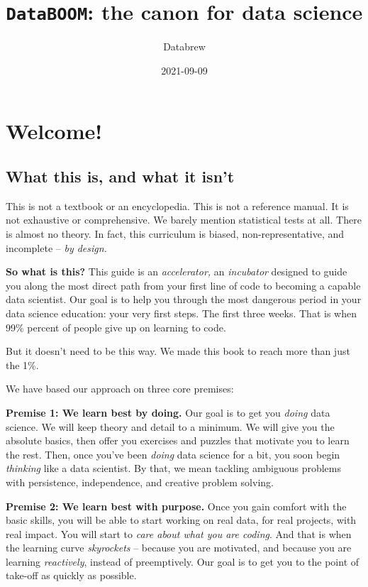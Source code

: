 \documentclass[
]{book}
\title{\texttt{DataBOOM}: the canon for data science}
\author{Databrew}
\date{2021-09-09}
\begin{document}
\maketitle

{
\setcounter{tocdepth}{1}
\tableofcontents
}
\hypertarget{welcome}{%
\chapter{Welcome!}\label{welcome}}

\hypertarget{what-this-is-and-what-it-isnt}{%
\section*{What this is, and what it isn't}\label{what-this-is-and-what-it-isnt}}

This is not a textbook or an encyclopedia. This is not a reference manual. It is not exhaustive or comprehensive. We barely mention statistical tests at all. There is almost no theory. In fact, this curriculum is biased, non-representative, and incomplete -- \emph{by design.}

\textbf{So what is this?} This guide is an \emph{accelerator,} an \emph{incubator} designed to guide you along the most direct path from your first line of code to becoming a capable data scientist. Our goal is to help you through the most dangerous period in your data science education: your very first steps. The first three weeks. That is when 99\% percent of people give up on learning to code.

But it doesn't need to be this way. We made this book to reach more than just the 1\%.

We have based our approach on three core premises:

\textbf{Premise 1: We learn best by doing.} Our goal is to get you \emph{doing} data science. We will keep theory and detail to a minimum. We will give you the absolute basics, then offer you exercises and puzzles that motivate you to learn the rest. Then, once you've been \emph{doing} data science for a bit, you soon begin \emph{thinking} like a data scientist. By that, we mean tackling ambiguous problems with persistence, independence, and creative problem solving.

\textbf{Premise 2: We learn best with purpose.} Once you gain comfort with the basic skills, you will be able to start working on real data, for real projects, with real impact. You will start to \emph{care about what you are coding}. And that is when the learning curve \emph{skyrockets} -- because you are motivated, and because you are learning \emph{reactively}, instead of preemptively. Our goal is to get you to the point of take-off as quickly as possible.
\end{document}
